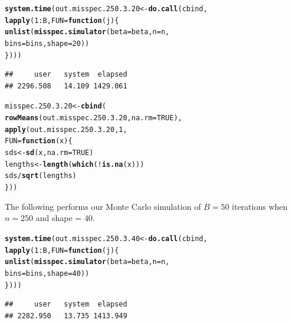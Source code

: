 \documentclass[11pt]{article}\usepackage[]{graphicx}\usepackage[]{color}
\makeatletter
\newcommand{\hlnum}[1]{\textcolor[rgb]{0.686,0.059,0.569}{#1}}%
\newcommand{\hlopt}[1]{\textcolor[rgb]{0,0,0}{#1}}%
\newcommand{\hlstd}[1]{\textcolor[rgb]{0.345,0.345,0.345}{#1}}%
\newcommand{\hlkwa}[1]{\textcolor[rgb]{0.161,0.373,0.58}{\textbf{#1}}}%
\newcommand{\hlkwb}[1]{\textcolor[rgb]{0.69,0.353,0.396}{#1}}%
\newcommand{\hlkwc}[1]{\textcolor[rgb]{0.333,0.667,0.333}{#1}}%
\newcommand{\hlkwd}[1]{\textcolor[rgb]{0.737,0.353,0.396}{\textbf{#1}}}%
\newenvironment{kframe}{%
 \def\at@end@of@kframe{}%
 \ifinner\ifhmode%
  \def\at@end@of@kframe{\end{minipage}}%
  \begin{minipage}{\columnwidth}%
 \fi\fi%
 \def\FrameCommand##1{\hskip\@totalleftmargin \hskip-\fboxsep
 \colorbox{shadecolor}{##1}\hskip-\fboxsep
     \hskip-\linewidth \hskip-\@totalleftmargin \hskip\columnwidth}%
 \MakeFramed {\advance\hsize-\width
   \@totalleftmargin\z@ \linewidth\hsize
   \@setminipage}}%
 {\par\unskip\endMakeFramed%
 \at@end@of@kframe}
\newenvironment{knitrout}{}{} %
\makeatother
\begin{document}
\begin{knitrout}
\color{fgcolor}\begin{kframe}
\begin{alltt}
\hlkwd{system.time}\hlstd{(out.misspec.250.3.20} \hlkwb{<-} \hlkwd{do.call}\hlstd{(cbind,}
  \hlkwd{lapply}\hlstd{(}\hlnum{1}\hlopt{:}\hlstd{B,} \hlkwc{FUN} \hlstd{=} \hlkwa{function}\hlstd{(}\hlkwc{j}\hlstd{)\{}
    \hlkwd{unlist}\hlstd{(}\hlkwd{misspec.simulator}\hlstd{(}\hlkwc{beta} \hlstd{= beta,} \hlkwc{n} \hlstd{= n,}
      \hlkwc{bins} \hlstd{= bins,} \hlkwc{shape} \hlstd{=} \hlnum{20}\hlstd{))}
\hlstd{\})))}
\end{alltt}
\begin{verbatim}
##     user   system  elapsed 
## 2296.508   14.109 1429.061
\end{verbatim}
\end{kframe}
\end{knitrout}

\begin{knitrout}
\color{fgcolor}\begin{kframe}
\begin{alltt}
\hlstd{misspec.250.3.20} \hlkwb{<-} \hlkwd{cbind}\hlstd{(}
  \hlkwd{rowMeans}\hlstd{(out.misspec.250.3.20,} \hlkwc{na.rm} \hlstd{=} \hlnum{TRUE}\hlstd{),}
  \hlkwd{apply}\hlstd{(out.misspec.250.3.20,} \hlnum{1}\hlstd{,}
  \hlkwc{FUN} \hlstd{=} \hlkwa{function}\hlstd{(}\hlkwc{x}\hlstd{)\{}
    \hlstd{sds} \hlkwb{<-} \hlkwd{sd}\hlstd{(x,} \hlkwc{na.rm} \hlstd{=} \hlnum{TRUE}\hlstd{)}
    \hlstd{lengths} \hlkwb{<-} \hlkwd{length}\hlstd{(}\hlkwd{which}\hlstd{(}\hlopt{!}\hlkwd{is.na}\hlstd{(x)))}
    \hlstd{sds} \hlopt{/} \hlkwd{sqrt}\hlstd{(lengths)}
  \hlstd{\}))}
\end{alltt}
\end{kframe}
\end{knitrout}

The following performs our Monte Carlo simulation of $B = 50$ iterations 
when $n = 250$ and shape = $40$.

\begin{knitrout}
\color{fgcolor}\begin{kframe}
\begin{alltt}
\hlkwd{system.time}\hlstd{(out.misspec.250.3.40} \hlkwb{<-} \hlkwd{do.call}\hlstd{(cbind,}
  \hlkwd{lapply}\hlstd{(}\hlnum{1}\hlopt{:}\hlstd{B,} \hlkwc{FUN} \hlstd{=} \hlkwa{function}\hlstd{(}\hlkwc{j}\hlstd{)\{}
    \hlkwd{unlist}\hlstd{(}\hlkwd{misspec.simulator}\hlstd{(}\hlkwc{beta} \hlstd{= beta,} \hlkwc{n} \hlstd{= n,}
      \hlkwc{bins} \hlstd{= bins,} \hlkwc{shape} \hlstd{=} \hlnum{40}\hlstd{))}
\hlstd{\})))}
\end{alltt}
\begin{verbatim}
##     user   system  elapsed 
## 2282.950   13.735 1413.949
\end{verbatim}
\end{kframe}
\end{knitrout}
\end{document}
